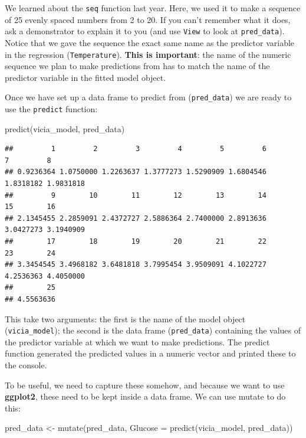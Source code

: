 \documentclass[
]{book}
\newenvironment{Shaded}{\begin{snugshade}}{\end{snugshade}}
\newcommand{\AttributeTok}[1]{\textcolor[rgb]{0.77,0.63,0.00}{#1}}
\newcommand{\FunctionTok}[1]{\textcolor[rgb]{0.00,0.00,0.00}{#1}}
\newcommand{\NormalTok}[1]{#1}
\newcommand{\OtherTok}[1]{\textcolor[rgb]{0.56,0.35,0.01}{#1}}
\begin{document}
We learned about the \texttt{seq} function last year. Here, we used it to make a sequence of 25 evenly spaced numbers from 2 to 20. If you can't remember what it does, ask a demonstrator to explain it to you (and use \texttt{View} to look at \texttt{pred\_data}). Notice that we gave the sequence the exact same name as the predictor variable in the regression (\texttt{Temperature}). \textbf{This is important}: the name of the numeric sequence we plan to make predictions from has to match the name of the predictor variable in the fitted model object.

Once we have set up a data frame to predict from (\texttt{pred\_data}) we are ready to use the \texttt{predict} function:

\begin{Shaded}
\begin{Highlighting}[]
\FunctionTok{predict}\NormalTok{(vicia\_model, pred\_data)}
\end{Highlighting}
\end{Shaded}

\begin{verbatim}
##         1         2         3         4         5         6         7         8 
## 0.9236364 1.0750000 1.2263637 1.3777273 1.5290909 1.6804546 1.8318182 1.9831818 
##         9        10        11        12        13        14        15        16 
## 2.1345455 2.2859091 2.4372727 2.5886364 2.7400000 2.8913636 3.0427273 3.1940909 
##        17        18        19        20        21        22        23        24 
## 3.3454545 3.4968182 3.6481818 3.7995454 3.9509091 4.1022727 4.2536363 4.4050000 
##        25 
## 4.5563636
\end{verbatim}

This take two arguments: the first is the name of the model object (\texttt{vicia\_model}); the second is the data frame (\texttt{pred\_data}) containing the values of the predictor variable at which we want to make predictions. The predict function generated the predicted values in a numeric vector and printed these to the console.

To be useful, we need to capture these somehow, and because we want to use \textbf{ggplot2}, these need to be kept inside a data frame. We can use mutate to do this:

\begin{Shaded}
\begin{Highlighting}[]
\NormalTok{pred\_data }\OtherTok{\textless{}{-}} \FunctionTok{mutate}\NormalTok{(pred\_data, }\AttributeTok{Glucose =} \FunctionTok{predict}\NormalTok{(vicia\_model, pred\_data))}
\end{Highlighting}
\end{Shaded}
\end{document}
